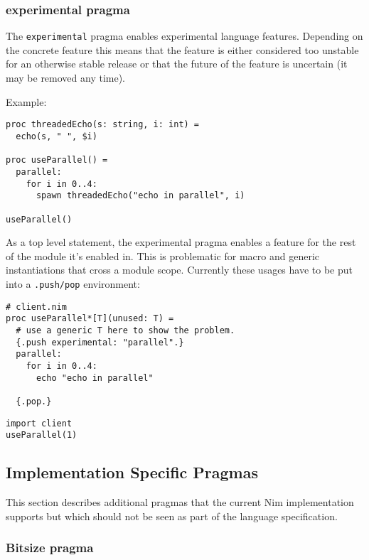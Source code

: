 \hypertarget{experimental-pragma}{%
\subsubsection{experimental pragma}\label{experimental-pragma}}

The \texttt{experimental} pragma enables experimental language features.
Depending on the concrete feature this means that the feature is either
considered too unstable for an otherwise stable release or that the
future of the feature is uncertain (it may be removed any time).

Example:

\begin{verbatim}
proc threadedEcho(s: string, i: int) =
  echo(s, " ", $i)

proc useParallel() =
  parallel:
    for i in 0..4:
      spawn threadedEcho("echo in parallel", i)

useParallel()
\end{verbatim}

As a top level statement, the experimental pragma enables a feature for
the rest of the module it's enabled in. This is problematic for macro
and generic instantiations that cross a module scope. Currently these
usages have to be put into a \texttt{.push/pop} environment:

\begin{verbatim}
# client.nim
proc useParallel*[T](unused: T) =
  # use a generic T here to show the problem.
  {.push experimental: "parallel".}
  parallel:
    for i in 0..4:
      echo "echo in parallel"

  {.pop.}
\end{verbatim}

\begin{verbatim}
import client
useParallel(1)
\end{verbatim}

\hypertarget{implementation-specific-pragmas}{%
\subsection{Implementation Specific
Pragmas}\label{implementation-specific-pragmas}}

This section describes additional pragmas that the current Nim
implementation supports but which should not be seen as part of the
language specification.

\hypertarget{bitsize-pragma}{%
\subsubsection{Bitsize pragma}\label{bitsize-pragma}}

